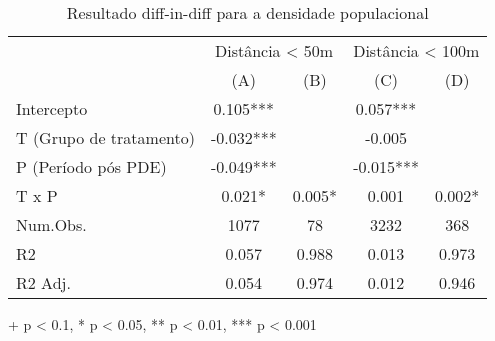 \begin{table}[h]
\caption{Resultado diff-in-diff para a densidade populacional} 
\centering
\fontsize{10.0pt}{12pt}\selectfont
\begin{tabular*}{.8\linewidth}{@{\extracolsep{\fill}}lcccc}
\toprule
 & \multicolumn{2}{c}{Distância < 50m} & \multicolumn{2}{c}{Distância < 100m} \\ 
\cmidrule(lr){2-3} \cmidrule(lr){4-5}
  & (A) & (B) & (C) & (D) \\ 
\midrule\addlinespace[2.5pt]
Intercepto & 0.105*** &  & 0.057*** &  \\ 
T (Grupo de tratamento) & -0.032*** &  & -0.005 &  \\ 
P (Período pós PDE) & -0.049*** &  & -0.015*** &  \\ 
{T x P} & {0.021*} & {0.005*} & {0.001} & {0.002*} \\ 
\midrule
Num.Obs. & 1077 & 78 & 3232 & 368 \\ 
R2 & 0.057 & 0.988 & 0.013 & 0.973 \\ 
R2 Adj. & 0.054 & 0.974 & 0.012 & 0.946 \\ 
\bottomrule
\end{tabular*}
\label{tab:did-censo}
\begin{minipage}{.8\linewidth}
+ p < 0.1, * p < 0.05, ** p < 0.01, *** p < 0.001\\
\end{minipage}
\end{table}

